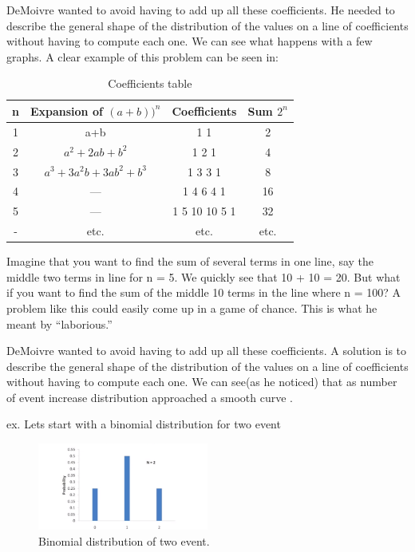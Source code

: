 \documentclass{article}
\begin{document}
DeMoivre wanted to avoid having to add up all these coefficients. He needed to describe the general
shape of the distribution of the values on a line of coefficients without having to compute each one. We can see what happens with a few graphs.
A clear example of this problem can be seen in:
\begin{table}[H]
\centering
\begin{tabular}{c|c|c|c}
    n &  Expansion of $ (a+b))^n $ & Coefficients & Sum $ 2^{n} $ \\\hline

    1 &  a+b& 1 1 & 2                                \\
    2 & $ a^2 +2ab+b^2 $ & 1 2 1 & 4                     \\
    3 & $ a^3+3a^{2}b+3ab^2+b^3 $ & 1 3 3 1 & 8                \\
    4 & ---   & 1 4 6 4 1 & 16                         \\
    5 & ---   & 1 5 10 10 5 1 & 32                     \\
    - & etc. & etc. & etc.                         \\

\end{tabular}
\caption{\label{tab:widgets}Coefficients table}
\end{table}

Imagine that you want to find the sum of
several terms in one line, say the middle two
terms in line for n = 5.
We quickly see that 10 + 10 = 20.
But what if you want to find the sum of the middle
10 terms in the line where n = 100? A problem like
this could easily come up in a game of chance. This
is what he meant by “laborious.”

DeMoivre wanted to avoid having to add up all these coefficients. A solution is to describe the general shape of the distribution of the values on a line of coefficients without having to compute each one. We
can see(as he noticed) that as number of event increase distribution approached a smooth curve \cite{DeMoivreDiscoveryNormalCurve}.

ex. Lets start with a binomial distribution for two event
\begin{figure}[H]
\centering
\includegraphics[width=0.5\textwidth]{images/0.png}
\caption{\label{fig:bin2}Binomial distribution of two event.}
\end{figure}
\end{document}
